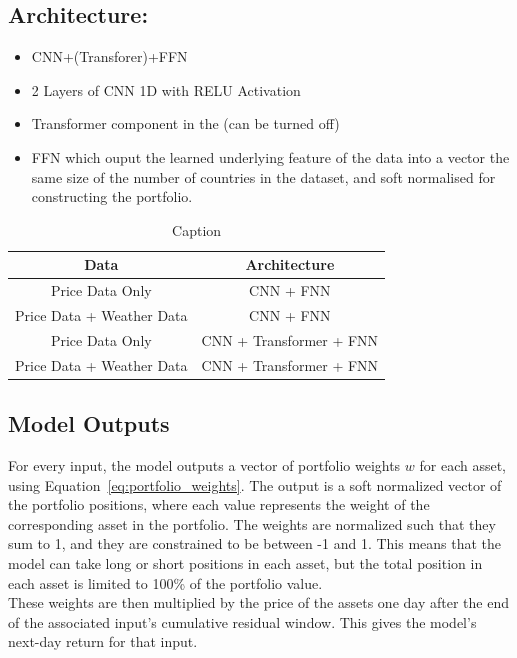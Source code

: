 \documentclass[12pt]{article}
\begin{document}
\subsection*{Architecture:}
\begin{itemize}
    \item CNN+(Transforer)+FFN
    \item 2 Layers of CNN 1D with RELU Activation
    \item Transformer component in the  (can be turned off)
    \item FFN which ouput the learned underlying feature of the data into a vector the same size of the number of countries in the dataset, and soft normalised for constructing the portfolio.
\end{itemize}

\begin{table}[htpb]
    \centering
    \begin{tabular}{c|c}
        Data & Architecture \\ 
        \hline \hline 
        Price Data Only & CNN + FNN \\ 
        Price Data + Weather Data & CNN + FNN \\ 
        Price Data Only & CNN + Transformer + FNN \\ 
        Price Data + Weather Data & CNN + Transformer + FNN \\
        \hline \hline 
    \end{tabular}
    \caption{Caption}
    \label{tab:my_label}
\end{table}

\subsection*{Model Outputs}

For every input, the model outputs a vector of portfolio weights $w$ for each asset, using Equation~\ref{eq:portfolio_weights}. The output is a soft normalized vector of the portfolio positions, where each value represents the weight of the corresponding asset in the portfolio. The weights are normalized such that they sum to 1, and they are constrained to be between -1 and 1. This means that the model can take long or short positions in each asset, but the total position in each asset is limited to 100\% of the portfolio value. 
\\

These weights are then multiplied by the price of the assets one day after the end of the associated input's cumulative residual window. This gives the model's next-day return for that input.
\\
\end{document}
